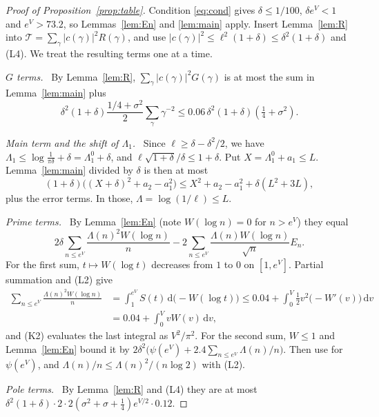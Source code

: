 \documentclass[11pt]{amsart}
\theoremstyle{remark}
\newcommand{\dd}{\,\mathrm{d}}
\newcommand{\step}[1]{\smallskip\noindent\textit{#1.}\ }
\begin{document}
\begin{proof}[Proof of Proposition~\ref{prop:table}]
Condition \eqref{eq:cond} gives $\delta\le1/100$, $\delta e^V<1$ and $e^V>73.2$, so Lemmas~\ref{lem:En} and \ref{lem:main} apply. Insert Lemma~\ref{lem:R} into $\mathcal T=\sum_\gamma|c(\gamma)|^2R(\gamma)$, and use $|c(\gamma)|^2\le\ell^2(1+\delta)\le\delta^2(1+\delta)$ and (L4). We treat the resulting terms one at a time.

\step{$G$ terms} By Lemma~\ref{lem:R}, $\sum_\gamma|c(\gamma)|^2G(\gamma)$ is at most the sum in Lemma~\ref{lem:main} plus
\[
\delta^2(1+\delta)\frac{1/4+\sigma^2}2\sum_\gamma\gamma^{-2}\le0.06\,\delta^2(1+\delta)(\tfrac14+\sigma^2).
\]

\step{Main term and the shift of $\Lambda_1$} Since $\ell\ge\delta-\delta^2/2$, we have $\Lambda_1\le\log\frac1{\pi\delta}+\delta=\Lambda_1^0+\delta$, and $\ell\sqrt{1+\delta}/\delta\le1+\delta$. Put $X=\Lambda_1^0+a_1\le L$. Lemma~\ref{lem:main} divided by $\delta$ is then at most
\[
(1+\delta)\big((X+\delta)^2+a_2-a_1^2\big)\le X^2+a_2-a_1^2+\delta(L^2+3L),
\]
plus the error terms. In those, $\Lambda=\log(1/\ell)\le L$.

\step{Prime terms} By Lemma~\ref{lem:En} (note $W(\log n)=0$ for $n>e^V$) they equal
\[
2\delta\sum_{n\le e^V}\frac{\Lambda(n)^2W(\log n)}n-2\sum_{n\le e^V}\frac{\Lambda(n)W(\log n)}{\sqrt n}E_n .
\]
For the first sum, $t\mapsto W(\log t)$ decreases from $1$ to $0$ on $[1,e^V]$. Partial summation and (L2) give
\begin{align*}
\sum_{n\le e^V}\frac{\Lambda(n)^2W(\log n)}n&=\int_1^{e^V}S(t)\dd\big(-W(\log t)\big)\le0.04+\int_0^V\tfrac12v^2\big(-W'(v)\big)\dd v\\
&=0.04+\int_0^VvW(v)\dd v,
\end{align*}
and (K2) evaluates the last integral as $V^2/\pi^2$. For the second sum, $W\le1$ and Lemma~\ref{lem:En} bound it by $2\delta^2\big(\psi(e^V)+2.4\sum_{n\le e^V}\Lambda(n)/n\big)$. Then use \cite{Schoenfeld} for $\psi(e^V)$, and $\Lambda(n)/n\le\Lambda(n)^2/(n\log2)$ with (L2).

\step{Pole terms} By Lemma~\ref{lem:R} and (L4) they are at most $\delta^2(1+\delta)\cdot2\cdot2(\sigma^2+\sigma+\frac14)e^{V/2}\cdot0.12$.


\end{proof}
\end{document}
